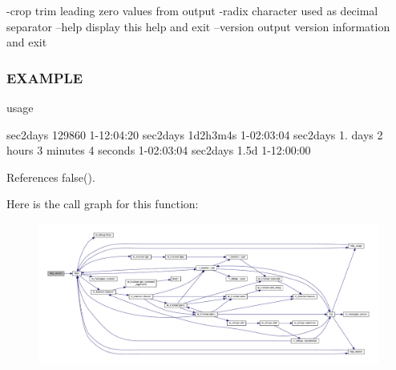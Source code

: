 -\/crop trim leading zero values from output -\/radix character used as decimal separator --help display this help and exit --version output version information and exit

\subsubsection*{E\+X\+A\+M\+P\+LE}

usage

sec2days 129860 1-\/12\+:04\+:20 sec2days 1d2h3m4s 1-\/02\+:03\+:04 sec2days 1. days 2 hours 3 minutes 4 seconds 1-\/02\+:03\+:04 sec2days 1.\+5d 1-\/12\+:00\+:00 

References false().

Here is the call graph for this function\+:
\nopagebreak
\begin{figure}[H]
\begin{center}
\leavevmode
\includegraphics[width=350pt]{sec2days_8f90_a39c21619b08a3c22f19e2306efd7f766_cgraph}
\end{center}
\end{figure}
